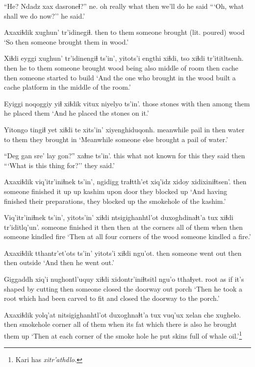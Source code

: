 \documentclass[12pt]{article}
\begin{document}
\gll ``He? Ndadz xax dasroneɬ?'' ne.
{oh really} what then {we'll do} {he said}
\glt ```Oh, what shall we do now?'' he said.'
\glend

\gll Axaxiɬdik xughun' tr'idinegiɬ.
then  {to them} {someone brought (lit. poured) wood}
\glt `So then someone brought them in wood.'
\glend

\gll Xiɬdi eyggi xughun' tr'idinengiɬ ts'in', yitots'i engthi  xiɬdi, tso xiɬdi tr'ititltsenh.
then he {to them} {someone brought wood} being also {middle of room} then cache then {someone started to build}
\glt `And the one who brought in the wood built a cache platform in the middle of the room.'
\glend

\gll Eyiggi noqoggiy yiɬ xiɬdik  vitux  niyelyo ts'in'.
those  stones  with then {among them} {he placed them} 
\glt `And he placed the stones on it.'
\glend

\gll Yitongo tingiɬ yet xiɬdi te xits'in' xiyenghiduqonh.
meanwhile pail in then water {to them} {they brought in}
\glt `Meanwhile someone else brought a pail of water.'
\glend

\gll ``Deg gan sre' lay gon?'' xaɬne  ts'in'.
this what {not known} for this {they said} then
\glt ```What is this thing for?'' they said.'
\glend

\gll Axaxiɬdik viq'itr'iniɬnek ts'in', ngidigg traɬtth'et xiq'idz xidoy xidixiniɬtsen'.
then  {someone finished it up} {}  up kashim upon door {they blocked up}
\glt `And having finished their preparations, they blocked up the smokehole of the kashim.'
\glend

\gll Viq'itr'iniɬnek ts'in', yitots'in' xiɬdi ntsigighanhtl'ot duxoghdinaɬt'a tux xiɬdi tr'iditlq'un'.
{someone finished it} {} then then {at the corners} {all of them} when then {someone kindled fire}
\glt `Then at all four corners of the wood someone kindled a fire.'
\glend

\gll Axaxiɬdik tthantr'et'ots ts'in' yitots'i xiɬdi ngu'ot.
then  {someone went out} {} then then outside
\glt `And then he went out.'
\glend

\gll Giggaddh xiq'i nughontl'uquy  xiɬdi xidontr'iniɬtsitl ngu'o tthaɬyet.
root {as if} {it's shaped by cutting} then {someone closed the doorway}   out porch 
\glt `Then he took a root which had been carved to fit and closed the doorway to the porch.'
\glend

\gll Axaxiɬdik yolq'at nitsigighanhtl'ot duxoghnaɬt'a tux vuq'ux xelan  che xughelo.
then  smokehole corner  {all of them} when {its fat} {which there is} also {he brought them up}
\glt `Then at each corner of the smoke hole he put skins full of whale oil.'\footnote{Kari has \em xitr'athdlo.}
\glend
\end{document}
